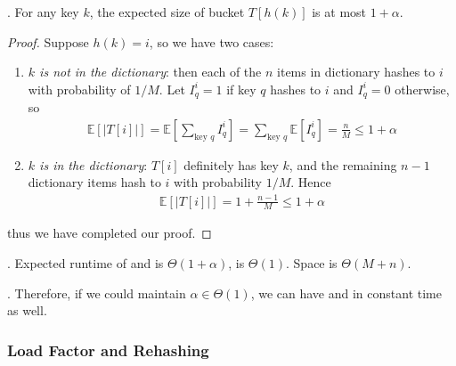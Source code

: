 \documentclass{article}
\begin{document}
\begin{thmm}[].
    For any key $k$, the expected size of bucket $T[h(k)]$ is at most $1 + \alpha$. 
\end{thmm}

\begin{proof}
    Suppose $h(k) = i$, so we have two cases: \begin{enumerate}
        \item \textit{$k$ is not in the dictionary}: then each of the $n$ items in dictionary hashes to $i$ with probability of $1 / M$. Let $I_q^i = 1$ if key $q$ hashes to $i$ and $I_q^i = 0$ otherwise, so 
        \begin{align*}
            \mathbb{E}[ |T[i]| ] 
            = \mathbb{E} \left[ \sum_{\text{key } q} I_q^i \right] 
            = \sum_{\text{key } q} \mathbb{E} \left[ I_q^i \right] 
            = \frac{n}{M} \leq 1 + \alpha
        \end{align*}
        \item \textit{$k$ is in the dictionary}: $T[i]$ definitely has key $k$, and the remaining $n -1$ dictionary items hash to $i$ with probability $1 / M$. Hence 
        \begin{align*}
            \mathbb{E}[ |T[i]| ] = 1 + \frac{n - 1}{M} \leq 1 + \alpha
        \end{align*}
    \end{enumerate}
    thus we have completed our proof. 
\end{proof}

\begin{result}[].
    Expected runtime of  and  is $\Theta(1 + \alpha)$,  is $\Theta(1)$. Space is $\Theta(M + n)$. 
\end{result}

\begin{discovery}[].
    Therefore, if we could maintain $\alpha \in \Theta(1)$, we can have  and  in constant time as well. 
\end{discovery}

\subsubsection{Load Factor and Rehashing}
\end{document}
